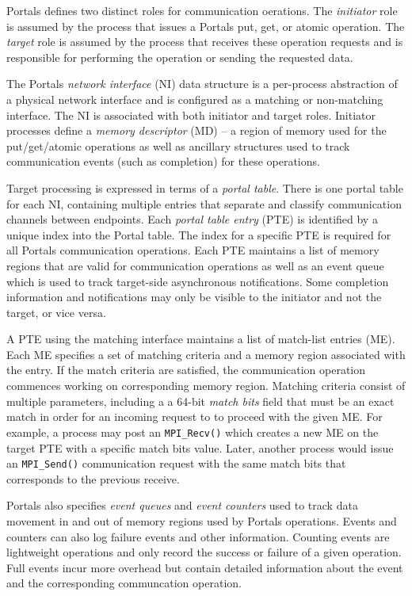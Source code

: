 Portals defines two distinct roles for communication oerations. The {\em
  initiator} role is assumed by the process that issues a Portals put, get, or
atomic operation. The {\em target} role is assumed by the process that receives
these operation requests and is responsible for performing the operation or
sending the requested data.

The Portals {\em network interface} (NI) data structure is a per-process
abstraction of a physical network interface and is configured as a
matching or non-matching interface. The NI is associated with both
initiator and target roles. Initiator processes define a {\em memory
  descriptor} (MD) -- a region of memory used for the put/get/atomic
operations as well as ancillary structures used to track communication
events (such as completion) for these operations.

Target processing is expressed in terms of a {\em portal table}. There is one
portal table for each NI, containing multiple entries that separate and
classify communication channels between endpoints.  Each {\em portal table
  entry} (PTE) is identified by a unique index into the Portal table. The index
for a specific PTE is required for all Portals communication operations. Each
PTE maintains a list of memory regions that are valid for communication
operations as well as an event queue which is used to track target-side
asynchronous notifications.  Some completion information and notifications may
only be visible to the initiator and not the target, or vice versa.

A PTE using the matching interface maintains a list of match-list entries (ME).
Each ME specifies a set of matching criteria and a memory region associated
with the entry. If the match criteria are satisfied, the communication
operation commences working on corresponding memory region. Matching criteria
consist of multiple parameters, including a a 64-bit {\em match bits} field
that must be an exact match in order for an incoming request to to proceed
with the given ME. For example, a process may post an {\tt MPI\_Recv()} which
creates a new ME on the target PTE with a specific match bits value. Later,
another process would issue an {\tt MPI\_Send()} communication request with
the same match bits that corresponds to the previous receive.

Portals also specifies {\em event queues} and {\em event counters}
used to track data movement in and out of memory regions used by Portals
operations. Events and counters can also log failure events and
other information. Counting events are lightweight operations and only
record the success or failure of a given operation. Full events incur
more overhead but contain detailed information about the event and
the corresponding communcation operation.

